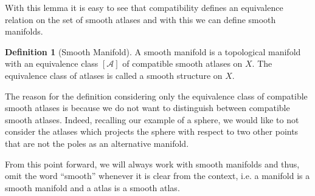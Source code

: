 \documentclass[]{article}
\theoremstyle{definition}
\theoremstyle{definition}
\newtheorem{definition}{Definition}[section]
\begin{document}
With this lemma it is easy to see that compatibility defines an equivalence 
relation on the set of smooth atlases and with this we can define smooth 
manifolds.

\begin{definition}[Smooth Manifold]
  A smooth manifold is a topological manifold with an equivalence class 
  \([\mathcal{A}]\) of compatible smooth atlases on \(X\). The equivalence 
  class of atlases is called a smooth structure on \(X\).
\end{definition}

The reason for the definition considering only the equivalence class 
of compatible smooth atlases is because we do not want to distinguish between 
compatible smooth atlases. Indeed, recalling our example of a sphere, 
we would like to not consider the atlases which projects the sphere with 
respect to two other points that are not the poles as an alternative manifold.

From this point forward, we will always work with smooth manifolds and thus, 
omit the word ``smooth'' whenever it is clear from the context, i.e. a manifold 
is a smooth manifold and a atlas is a smooth atlas. 
\end{document}
